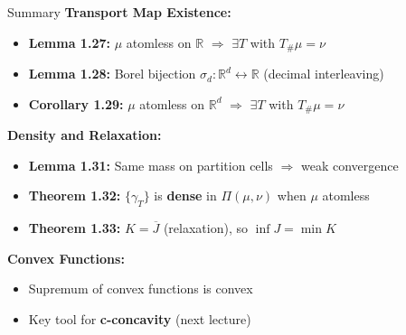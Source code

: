 \documentclass[aspectratio=169]{beamer}
\newcommand{\R}{\mathbb{R}}
\begin{document}
\begin{frame}{Summary}
\textbf{Transport Map Existence:}
\begin{itemize}
    \item \textbf{Lemma 1.27:} $\mu$ atomless on $\R$ $\Rightarrow$ $\exists T$ with $T_\# \mu = \nu$
    \item \textbf{Lemma 1.28:} Borel bijection $\sigma_d : \R^d \leftrightarrow \R$ (decimal interleaving)
    \item \textbf{Corollary 1.29:} $\mu$ atomless on $\R^d$ $\Rightarrow$ $\exists T$ with $T_\# \mu = \nu$
\end{itemize}

\vspace{0.3cm}
\textbf{Density and Relaxation:}
\begin{itemize}
    \item \textbf{Lemma 1.31:} Same mass on partition cells $\Rightarrow$ weak convergence
    \item \textbf{Theorem 1.32:} $\{\gamma_T\}$ is \textbf{dense} in $\Pi(\mu, \nu)$ when $\mu$ atomless
    \item \textbf{Theorem 1.33:} $K = \overline{J}$ (relaxation), so $\boxed{\inf J = \min K}$
\end{itemize}

\vspace{0.3cm}
\textbf{Convex Functions:}
\begin{itemize}
    \item Supremum of convex functions is convex
    \item Key tool for \textbf{c-concavity} (next lecture)
\end{itemize}
\end{frame}
\end{document}
